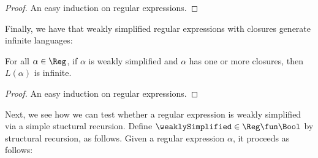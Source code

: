 \begin{proof}
An easy induction on regular expressions.
\end{proof}

Finally, we have that weakly simplified regular expressions with
closures generate infinite languages:

\begin{proposition}
For all $\alpha\in\Reg$, if $\alpha$ is weakly simplified and
$\alpha$ has one or more closures, then $L(\alpha)$ is
infinite.
\end{proposition}

\begin{proof}
An easy induction on regular expressions.
\end{proof}

Next, we see how we can test whether a regular expression is weakly
simplified via a simple stuctural recursion.  Define
$\weaklySimplified\in\Reg\fun\Bool$ by structural recursion, as
follows.  Given a regular expression $\alpha$, it proceeds as follows:
